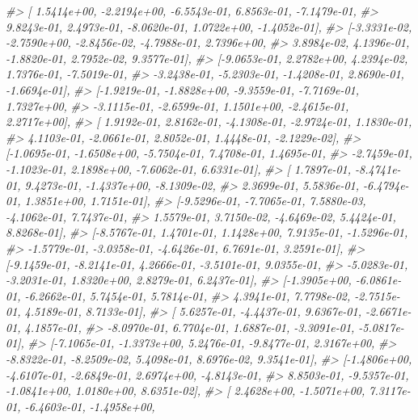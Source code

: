 \documentclass[]{book}
\newenvironment{Shaded}{\begin{snugshade}}{\end{snugshade}}
\newcommand{\CommentTok}[1]{\textcolor[rgb]{0.56,0.35,0.01}{\textit{#1}}}
\begin{document}
\begin{Shaded}
\begin{Highlighting}[]
\CommentTok{#>         [ 1.5414e+00, -2.2194e+00, -6.5543e-01,  6.8563e-01, -7.1479e-01,}
\CommentTok{#>           9.8243e-01,  2.4973e-01, -8.0620e-01,  1.0722e+00, -1.4052e-01],}
\CommentTok{#>         [-3.3331e-02, -2.7590e+00, -2.8456e-02, -4.7988e-01,  2.7396e+00,}
\CommentTok{#>           3.8984e-02,  4.1396e-01, -1.8820e-01,  2.7952e-02,  9.3577e-01],}
\CommentTok{#>         [-9.0653e-01,  2.2782e+00,  4.2394e-02,  1.7376e-01, -7.5019e-01,}
\CommentTok{#>          -3.2438e-01, -5.2303e-01, -1.4208e-01,  2.8690e-01, -1.6694e-01],}
\CommentTok{#>         [-1.9219e-01, -1.8828e+00, -9.3559e-01, -7.7169e-01,  1.7327e+00,}
\CommentTok{#>          -3.1115e-01, -2.6599e-01,  1.1501e+00, -2.4615e-01,  2.2717e+00],}
\CommentTok{#>         [ 1.9192e-01,  2.8162e-01, -4.1308e-01, -2.9724e-01,  1.1830e-01,}
\CommentTok{#>           4.1103e-01, -2.0661e-01,  2.8052e-01,  1.4448e-01, -2.1229e-02],}
\CommentTok{#>         [-1.0695e-01, -1.6508e+00, -5.7504e-01,  7.4708e-01,  1.4695e-01,}
\CommentTok{#>          -2.7459e-01, -1.1023e-01,  2.1898e+00, -7.6062e-01,  6.6331e-01],}
\CommentTok{#>         [ 1.7897e-01, -8.4741e-01,  9.4273e-01, -1.4337e+00, -8.1309e-02,}
\CommentTok{#>           2.3699e-01,  5.5836e-01, -6.4794e-01,  1.3851e+00,  1.7151e-01],}
\CommentTok{#>         [-9.5296e-01, -7.7065e-01,  7.5880e-03, -4.1062e-01,  7.7437e-01,}
\CommentTok{#>           1.5579e-01,  3.7150e-02, -4.6469e-02,  5.4424e-01,  8.8268e-01],}
\CommentTok{#>         [-8.5767e-01,  1.4701e-01,  1.1428e+00,  7.9135e-01, -1.5296e-01,}
\CommentTok{#>          -1.5779e-01, -3.0358e-01, -4.6426e-01,  6.7691e-01,  3.2591e-01],}
\CommentTok{#>         [-9.1459e-01, -8.2141e-01,  4.2666e-01, -3.5101e-01,  9.0355e-01,}
\CommentTok{#>          -5.0283e-01, -3.2031e-01,  1.8320e+00,  2.8279e-01,  6.2437e-01],}
\CommentTok{#>         [-1.3905e+00, -6.0861e-01, -6.2662e-01,  5.7454e-01,  5.7814e-01,}
\CommentTok{#>           4.3941e-01,  7.7798e-02, -2.7515e-01,  4.5189e-01,  8.7133e-01],}
\CommentTok{#>         [ 5.6257e-01, -4.4437e-01,  9.6367e-01, -2.6671e-01,  4.1857e-01,}
\CommentTok{#>          -8.0970e-01,  6.7704e-01,  1.6887e-01, -3.3091e-01, -5.0817e-01],}
\CommentTok{#>         [-7.1065e-01, -1.3373e+00,  5.2476e-01, -9.8477e-01,  2.3167e+00,}
\CommentTok{#>          -8.8322e-01, -8.2509e-02,  5.4098e-01,  8.6976e-02,  9.3541e-01],}
\CommentTok{#>         [-1.4806e+00, -4.6107e-01, -2.6849e-01,  2.6974e+00, -4.8143e-01,}
\CommentTok{#>           8.8503e-01, -9.5357e-01, -1.0841e+00,  1.0180e+00,  8.6351e-02],}
\CommentTok{#>         [ 2.4628e+00, -1.5071e+00,  7.3117e-01, -6.4603e-01, -1.4958e+00,}

\end{Highlighting}
\end{Shaded}
\end{document}

